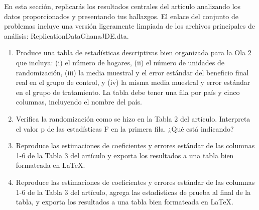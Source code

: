 \documentclass[11pt,a4paper,english]{article}
\begin{document}
En esta sección, replicarás los resultados centrales del artículo analizando los datos proporcionados y presentando tus hallazgos. El enlace del conjunto de problemas incluye una versión ligeramente limpiada de los archivos principales de análisis: ReplicationDataGhanaJDE.dta.

\begin{enumerate}
    \item Produce una tabla de estadísticas descriptivas bien organizada para la Ola 2 que incluya: (i) el número de hogares, (ii) el número de unidades de randomización, (iii) la media muestral y el error estándar del beneficio final real en el grupo de control, y (iv) la misma media muestral y error estándar en el grupo de tratamiento. La tabla debe tener una fila por país y cinco columnas, incluyendo el nombre del país.
    \item Verifica la randomización como se hizo en la Tabla 2 del artículo. Interpreta el valor p de las estadísticas F en la primera fila. ¿Qué está indicando?
    \item Reproduce las estimaciones de coeficientes y errores estándar de las columnas 1-6 de la Tabla 3 del artículo y exporta los resultados a una tabla bien formateada en LaTeX.
    \item Reproduce las estimaciones de coeficientes y errores estándar de las columnas 1-6 de la Tabla 3 del artículo, agrega las estadísticas de prueba al final de la tabla, y exporta los resultados a una tabla bien formateada en LaTeX.
\end{enumerate}
\end{document}
